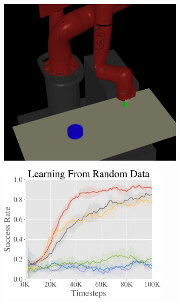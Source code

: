 \begin{figure}[H]
  \begin{center}
    \begin{subfigure}[b]{0.26\textwidth}
        \includegraphics[width=0.99\textwidth,trim={5cm 0 5cm 0},clip]{awac/figures/imgs/sawyer_push.png}
    \end{subfigure}
    \hspace{0.03\textwidth}
    \begin{subfigure}[b]{0.45\textwidth}
        \includegraphics[width=0.9\textwidth]{awac/figures/rig/pusher_random-crop.pdf}
        

\end{subfigure}
\end{center}
\end{figure}

